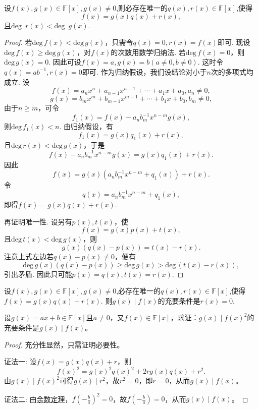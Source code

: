 \documentclass[../../main.tex]{subfiles}
\begin{document}
\begin{theorem}[多项式的带余除法]\label{theorem:多项式的带余除法}
设\(f(x),g(x)\in\mathbb{F}[x],g(x)\neq 0\),则必存在唯一的\(q(x),r(x)\in\mathbb{F}[x]\),使得
\[
f(x)=g(x)q(x)+r(x),
\]
且\(\text{deg }\,r(x)<\text{deg }\,g(x)\).
\end{theorem}
\begin{proof}
若\(\mathrm{deg }\,f(x)<\mathrm{deg }\,g(x)\)，只需令\(q(x)=0,r(x)=f(x)\)即可.
现设\(\mathrm{deg }\,f(x)\geqslant \mathrm{deg }\,g(x)\)，对\(f(x)\)的次数用数学归纳法. 若\(\mathrm{deg }\,f(x)=0\)，则\(\mathrm{deg }\,g(x)=0\). 因此可设\(f(x)=a,g(x)=b(a\neq 0,b\neq 0)\). 这时令\(q(x)=ab^{-1},r(x)=0\)即可. 作为归纳假设，我们设结论对小于\(n\)次的多项式均成立. 设
\[
f(x)=a_nx^n + a_{n - 1}x^{n - 1}+\cdots+a_1x + a_0, a_n\neq 0,
\]
\[
g(x)=b_mx^m + b_{m - 1}x^{m - 1}+\cdots+b_1x + b_0, b_m\neq 0,
\]
由于\(n\geqslant  m\)，可令
\[
f_1(x)=f(x)-a_nb_m^{-1}x^{n - m}g(x),
\]
则\(\mathrm{deg }\,f_1(x)<n\). 由归纳假设，有
\[
f_1(x)=g(x)q_1(x)+r(x),
\]
且\(\mathrm{deg }\,r(x)<\mathrm{deg }\,g(x)\)，于是
\[
f(x)-a_nb_m^{-1}x^{n - m}g(x)=g(x)q_1(x)+r(x).
\]
因此
\[
f(x)=g(x)(a_nb_m^{-1}x^{n - m}+q_1(x))+r(x).
\]
令
\[
q(x)=a_nb_m^{-1}x^{n - m}+q_1(x),
\]
即得$f(x)=g(x)q(x)+r(x)$.

再证明唯一性. 设另有\(p(x),t(x)\)，使
\[
f(x)=g(x)p(x)+t(x),
\]
且\(\mathrm{deg }\,t(x)<\mathrm{deg }\,g(x)\)，则
\[
g(x)(q(x)-p(x))=t(x)-r(x).
\]
注意上式左边若\(q(x)-p(x)\neq 0\)，便有
\[
\mathrm{deg }\,g(x)(q(x)-p(x))\geqslant \mathrm{deg }\,g(x)>\mathrm{deg }\,(t(x)-r(x)),
\]
引出矛盾. 因此只可能\(p(x)=q(x),t(x)=r(x)\).
\end{proof}

\begin{corollary}\label{corollary:整除关于多项式的带余除法的充要条件}
设\(f(x),g(x)\in\mathbb{F}[x],g(x)\neq 0\),必存在唯一的\(q(x),r(x)\in\mathbb{F}[x]\),使得$f(x)=g(x)q(x)+r(x)$. 
则\(g(x)\mid f(x)\)的充要条件是\(r(x)=0\).
\end{corollary}

\begin{example}
设\(g(x)=ax + b\in\mathbb{F}[x]\)且\(a\neq0\)，又\(f(x)\in\mathbb{F}[x]\)，求证：\(g(x)\mid f(x)^2\)的充要条件是\(g(x)\mid f(x)\)。
\end{example}
\begin{proof}
充分性显然，只需证明必要性。

{\color{blue}证法一:}
设\(f(x)=g(x)q(x)+r\)，则
\[
f(x)^2 = g(x)^2q(x)^2 + 2rg(x)q(x)+r^2.
\]
由\(g(x)\mid f(x)^2\)可得\(g(x)\mid r^2\)，故\(r^2 = 0\)，即\(r = 0\)，从而\(g(x)\mid f(x)\)。

{\color{blue}证法二:}
由\hyperref[theorem:余数定理]{余数定理}，\(f\left(-\frac{b}{a}\right)^2 = 0\)，故\(f\left(-\frac{b}{a}\right)= 0\)，从而\(g(x)\mid f(x)\)。
\end{proof}
\end{document}

